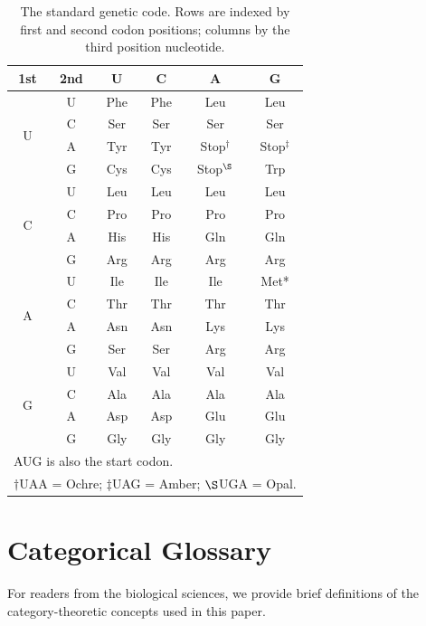 \documentclass[12pt,a4paper]{article}
\theoremstyle{definition}
\begin{document}
\begin{table}[H]
\centering
\caption{The standard genetic code. Rows are indexed by first and second codon positions; columns by the third position nucleotide.}
\label{tab:full-codon-table}
\small
\begin{tabular}{cc|cccc}
\toprule
\textbf{1st} & \textbf{2nd} & \textbf{U} & \textbf{C} & \textbf{A} & \textbf{G} \\
\midrule
\multirow{4}{*}{U}
  & U & Phe & Phe & Leu & Leu \\
  & C & Ser & Ser & Ser & Ser \\
  & A & Tyr & Tyr & Stop$^\dagger$ & Stop$^\ddagger$ \\
  & G & Cys & Cys & Stop$^\S$ & Trp \\
\midrule
\multirow{4}{*}{C}
  & U & Leu & Leu & Leu & Leu \\
  & C & Pro & Pro & Pro & Pro \\
  & A & His & His & Gln & Gln \\
  & G & Arg & Arg & Arg & Arg \\
\midrule
\multirow{4}{*}{A}
  & U & Ile & Ile & Ile & Met* \\
  & C & Thr & Thr & Thr & Thr \\
  & A & Asn & Asn & Lys & Lys \\
  & G & Ser & Ser & Arg & Arg \\
\midrule
\multirow{4}{*}{G}
  & U & Val & Val & Val & Val \\
  & C & Ala & Ala & Ala & Ala \\
  & A & Asp & Asp & Glu & Glu \\
  & G & Gly & Gly & Gly & Gly \\
\bottomrule
\multicolumn{6}{l}{\footnotesize *AUG is also the start codon.} \\
\multicolumn{6}{l}{\footnotesize $\dagger$UAA = Ochre; $\ddagger$UAG = Amber; $\S$UGA = Opal.}
\end{tabular}
\end{table}

\section{Categorical Glossary}\label{app:glossary}

For readers from the biological sciences, we provide brief definitions of the category-theoretic concepts used in this paper.
\end{document}
